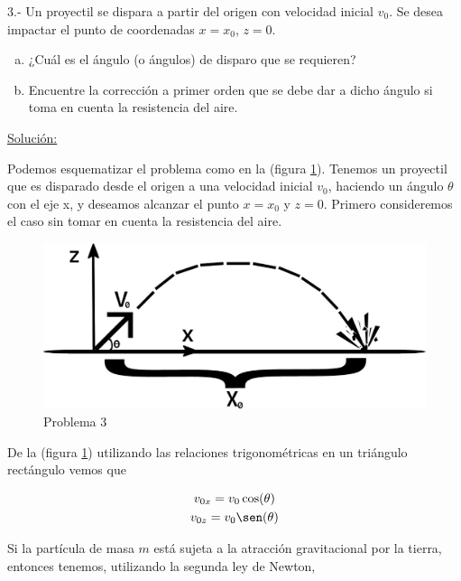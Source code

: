 \documentclass[a4paper,10pt]{article}
\begin{document}
3.- Un proyectil se dispara a partir del origen con velocidad inicial $v_{0}$.
Se desea impactar el punto de coordenadas $x=x_{0}$, $z=0$.

\begin{enumerate}[a)]
 \item ¿Cuál es el ángulo (o ángulos) de disparo que se requieren?
 \item Encuentre la corrección a primer orden que se debe dar a dicho ángulo si toma 
 en cuenta la resistencia del aire.
\end{enumerate}
\vspace{.3cm}

\underline{Solución:}

\vspace{.3cm}

Podemos esquematizar el problema como en la (figura \ref{fig:problema3}). 
Tenemos un proyectil que es disparado desde el origen a una velocidad 
inicial $v_0$, haciendo un ángulo $\theta$ con el eje x, y deseamos
alcanzar el punto $x=x_0$ y $z=0$. Primero consideremos el caso sin
tomar en cuenta la resistencia del aire.

\begin{figure}[ht]
 \centering
\includegraphics[scale=0.3]{problema3fig1}
\caption{Problema 3}
\label{fig:problema3}
\end{figure}

\vspace{.3cm}

De la (figura \ref{fig:problema3}) utilizando las relaciones trigonométricas en un 
triángulo rectángulo vemos que

\begin{gather*}
v_{0x} = v_0\cos(\theta) \\
v_{0z} = v_0\sen(\theta)
\end{gather*}


Si la partícula de masa $m$ está sujeta a la atracción gravitacional
por la tierra, entonces tenemos, utilizando la segunda ley de Newton,
\end{document}
